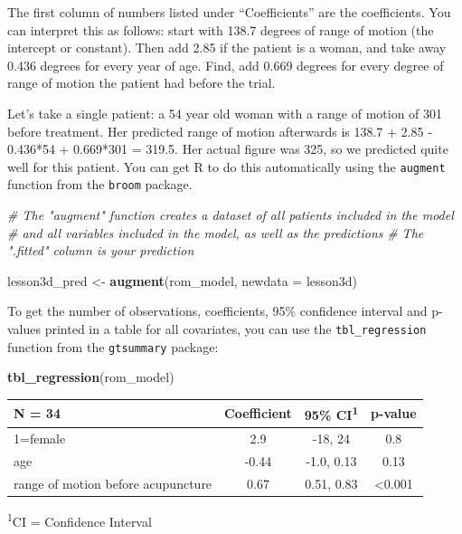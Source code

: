 \documentclass[]{book}
\newenvironment{Shaded}{\begin{snugshade}}{\end{snugshade}}
\newcommand{\CommentTok}[1]{\textcolor[rgb]{0.56,0.35,0.01}{\textit{#1}}}
\newcommand{\DataTypeTok}[1]{\textcolor[rgb]{0.13,0.29,0.53}{#1}}
\newcommand{\KeywordTok}[1]{\textcolor[rgb]{0.13,0.29,0.53}{\textbf{#1}}}
\newcommand{\NormalTok}[1]{#1}
\newcommand{\StringTok}[1]{\textcolor[rgb]{0.31,0.60,0.02}{#1}}
\begin{document}
The first column of numbers listed under ``Coefficients'' are the coefficients. You can interpret this as follows: start with 138.7 degrees of range of motion (the intercept or constant). Then add 2.85 if the patient is a woman, and take away 0.436 degrees for every year of age. Find, add 0.669 degrees for every degree of range of motion the patient had before the trial.

Let's take a single patient: a 54 year old woman with a range of motion of 301 before treatment. Her predicted range of motion afterwards is 138.7 + 2.85 - 0.436*54 + 0.669*301 = 319.5. Her actual figure was 325, so we predicted quite well for this patient. You can get R to do this automatically using the \texttt{augment} function from the \texttt{broom} package.

\begin{Shaded}
\begin{Highlighting}[]
\CommentTok{# The "augment" function creates a dataset of all patients included in the model}
\CommentTok{# and all variables included in the model, as well as the predictions}
\CommentTok{# The ".fitted" column is your prediction}

\NormalTok{lesson3d_pred <-}
\StringTok{  }\KeywordTok{augment}\NormalTok{(rom_model,}
          \DataTypeTok{newdata =}\NormalTok{ lesson3d)}
\end{Highlighting}
\end{Shaded}

To get the number of observations, coefficients, 95\% confidence interval and p-values printed in a table for all covariates, you can use the \texttt{tbl\_regression} function from the \texttt{gtsummary} package:

\begin{Shaded}
\begin{Highlighting}[]
\KeywordTok{tbl_regression}\NormalTok{(rom_model)}
\end{Highlighting}
\end{Shaded}

\captionsetup[table]{labelformat=empty,skip=1pt}
\begin{longtable}{lccc}
\toprule
\textbf{N = 34} & \textbf{Coefficient} & \textbf{95\% CI}\textsuperscript{1} & \textbf{p-value} \\ 
\midrule
1=female & 2.9 & -18, 24 & 0.8 \\ 
age & -0.44 & -1.0, 0.13 & 0.13 \\ 
range of motion before acupuncture & 0.67 & 0.51, 0.83 & <0.001 \\ 
\bottomrule
\end{longtable}
\vspace{-5mm}
\begin{minipage}{\linewidth}
\textsuperscript{1}CI = Confidence Interval \\ 
\end{minipage}
\end{document}
